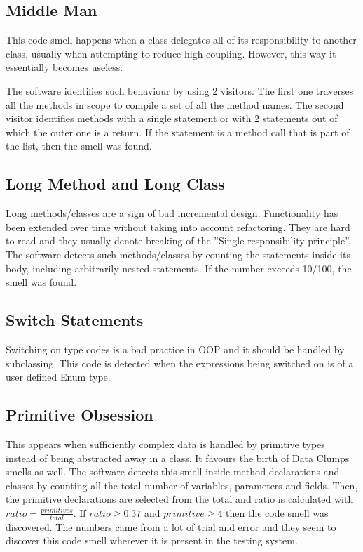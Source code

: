 \documentclass[a4paper]{article}
\begin{document}
\subsection{Middle Man}
This code smell happens when a class delegates all of its responsibility to
another class, usually when attempting to reduce high coupling. However, this
way it essentially becomes useless.

The software identifies such behaviour by using 2 visitors.
The first one traverses all the methods in scope to compile a set of all the
method names.
The second visitor identifies methods with a single statement or with 2
statements
out of which the outer one is a return.
If the statement is a method call that is part of the list, then the smell was
found.

\subsection{Long Method and Long Class}
Long methods/classes are a sign of bad incremental design.
Functionality has been
extended over time without taking into account refactoring.
They are hard to read and they usually denote breaking of the
''Single responsibility principle''.
The software detects such methods/classes by counting the statements inside its
body, including arbitrarily nested statements.
If the number exceeds 10/100, the smell was found.

\subsection{Switch Statements}
Switching on type codes is a bad practice in OOP and it should be handled by
subclassing.
This code is detected when the expressions being switched on is of
a user defined Enum type.

\subsection{Primitive Obsession}
This appears when sufficiently complex data is handled by primitive types
instead of being abstracted away in a class.
It favours the birth of Data Clumps smells as well.
The software detects this smell inside method declarations and classes by
counting all the total number of variables, parameters and fields.
Then, the primitive declarations are selected from the total and ratio
is calculated with $ratio=\frac{primitives}{total}$.
If $ratio \geq 0.37$ and $primitive \geq 4$ then the code smell was discovered.
The numbers came from a lot of trial and error and they seem to discover this
code smell wherever it is present in the testing system.
\end{document}
